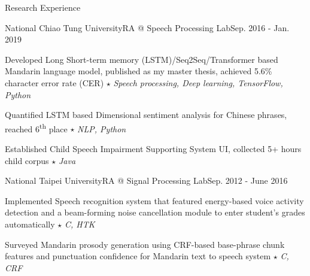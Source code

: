 \documentclass{resume_short} %
\newcommand{\ts}{\textsuperscript}
\begin{document}
\begin{rSection}{Research Experience}
    \begin{rSubsection3}{National Chiao Tung University}{RA @ Speech Processing Lab}{Sep. 2016 - Jan. 2019}
        \item Developed Long Short-term memory (LSTM)/Seq2Seq/Transformer based Mandarin language model, published as my master thesis, achieved 5.6\% character error rate (CER) \quad$\star$ {\em Speech processing, Deep learning, TensorFlow, Python}
        \item Quantified LSTM based Dimensional sentiment analysis for Chinese phrases, reached 6\ts{th} place \quad $\star$ {\em NLP, Python}
        \item Established Child Speech Impairment Supporting System UI, collected 5+ hours child corpus \quad $\star$ {\em Java}
    \end{rSubsection3}
    \begin{rSubsection3}{National Taipei University}{RA @ Signal Processing Lab}{Sep. 2012 - June 2016}
        \item Implemented Speech recognition system that featured energy-based voice activity detection and a beam-forming noise cancellation module to enter student’s grades automatically \quad$\star$ {\em C, HTK}
        \item Surveyed Mandarin prosody generation using CRF-based base-phrase chunk features and punctuation confidence for Mandarin text to speech system \quad$\star$ {\em C, CRF}
    \end{rSubsection3}
\end{rSection}


\end{document}
